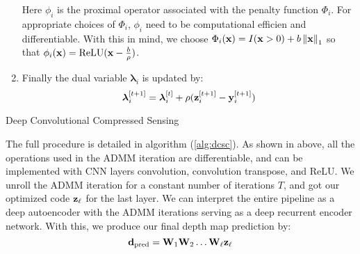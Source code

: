 \begin{enumerate}
  Here $\phi_i$ is the proximal operator associated with the penalty function $\Phi_i$. For appropriate choices of $\Phi_i$, $\phi_i$ need to be computational efficien and differentiable. With this in mind, we choose $\Phi_i(\mathbf{x}) = I(\mathbf{x} > 0) + b\left\Vert\mathbf{x}\right\Vert_1$ so that $\phi_i(\mathbf{x}) = \text{ReLU}(\mathbf{x} - \frac{b}{\rho})$.
\item Finally the dual variable $\bm{\lambda}_i$ is updated by:
  \begin{equation}
    \label{eq:lupdate}
    \bm{\lambda}_i^{[t+1]} = \bm{\lambda}_i^{[t]} + \rho(\mathbf{z}_i^{[t+1]} - \mathbf{y}_i^{[t+1]})
  \end{equation}
\end{enumerate}
\begin{algorithm}
  \caption{Deep Convolutional Compressed Sensing}
  \label{alg:dcsc}
\end{algorithm}

The full procedure is detailed in algorithm (\ref{alg:dcsc}).
As shown in above, all the operations used in the ADMM iteration are differentiable, and can be implemented with CNN layers \eg convolution, convolution transpose, and ReLU. We unroll the ADMM iteration for a constant number of iterations $T$, and got our optimized code $\mathbf{z}_\ell$ for the last layer.
We can interpret the entire pipeline as a deep autoencoder with the ADMM iterations serving as a deep recurrent encoder network.
With this, we produce our final depth map prediction by:
\begin{equation}
  \label{eq:recon}
  \mathbf{d}_\text{pred} = \mathbf{W}_1\mathbf{W}_2\ldots \mathbf{W}_{\ell}\mathbf{z}_{\ell}
\end{equation}


